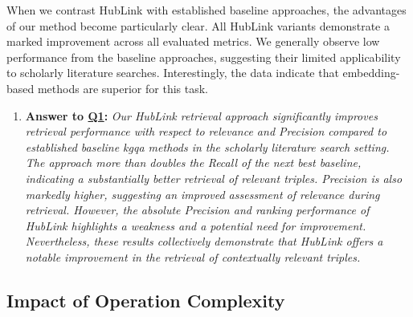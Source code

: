 When we contrast HubLink with established baseline approaches, the advantages of our method become particularly clear. All HubLink variants demonstrate a marked improvement across all evaluated metrics. We generally observe low performance from the baseline approaches, suggesting their limited applicability to scholarly literature searches. Interestingly, the data indicate that embedding-based methods are superior for this task.


\begin{enumerate}[label={}]
    \item \textbf{Answer to \hyperref[sec:evaluation_gqm_plan]{Q1}:} \textit{Our HubLink retrieval approach significantly improves retrieval performance with respect to relevance and Precision compared to established baseline \gls{kgqa} methods in the scholarly literature search setting. The approach more than doubles the Recall of the next best baseline, indicating a substantially better retrieval of relevant triples. Precision is also markedly higher, suggesting an improved assessment of relevance during retrieval. However, the absolute Precision and ranking performance of HubLink highlights a weakness and a potential need for improvement. Nevertheless, these results collectively demonstrate that HubLink offers a notable improvement in the retrieval of contextually relevant triples.}
\end{enumerate}

\subsection{Impact of Operation Complexity}

